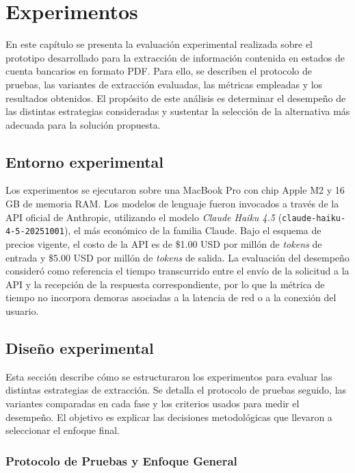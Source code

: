 \chapter{Experimentos}\label{chap:experimentos}

En este capítulo se presenta la evaluación experimental realizada sobre el prototipo desarrollado para la extracción de información contenida en estados de cuenta bancarios en formato PDF. Para ello, se describen el protocolo de pruebas, las variantes de extracción evaluadas, las métricas empleadas y los resultados obtenidos. El propósito de este análisis es determinar el desempeño de las distintas estrategias consideradas y sustentar la selección de la alternativa más adecuada para la solución propuesta.

\section{Entorno experimental}

Los experimentos se ejecutaron sobre una MacBook Pro con chip Apple M2 y 16 GB de memoria RAM. Los modelos de lenguaje fueron invocados a través de la API oficial de Anthropic, utilizando el modelo \textit{Claude Haiku 4.5} (\texttt{claude-haiku-4-5-20251001}), el más económico de la familia Claude. Bajo el esquema de precios vigente, el costo de la API es de \$1.00 USD por millón de \textit{tokens} de entrada y \$5.00 USD por millón de \textit{tokens} de salida. La evaluación del desempeño consideró como referencia el tiempo transcurrido entre el envío de la solicitud a la API y la recepción de la respuesta correspondiente, por lo que la métrica de tiempo no incorpora demoras asociadas a la latencia de red o a la conexión del usuario.


\section{Diseño experimental}

Esta sección describe cómo se estructuraron los experimentos para evaluar las distintas estrategias de extracción. Se detalla el protocolo de pruebas seguido, las variantes comparadas en cada fase y los criterios usados para medir el desempeño. El objetivo es explicar las decisiones metodológicas que llevaron a seleccionar el enfoque final.

\subsection{Protocolo de Pruebas y Enfoque General}

